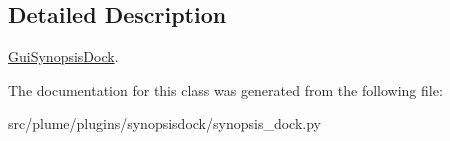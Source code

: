 \subsection{Detailed Description}
\hyperlink{classplume-creator_1_1src_1_1plume_1_1plugins_1_1synopsisdock_1_1synopsis__dock_1_1_gui_synopsis_dock}{Gui\+Synopsis\+Dock}. 

The documentation for this class was generated from the following file\+:\begin{DoxyCompactItemize}
\item 
src/plume/plugins/synopsisdock/synopsis\+\_\+dock.\+py\end{DoxyCompactItemize}
